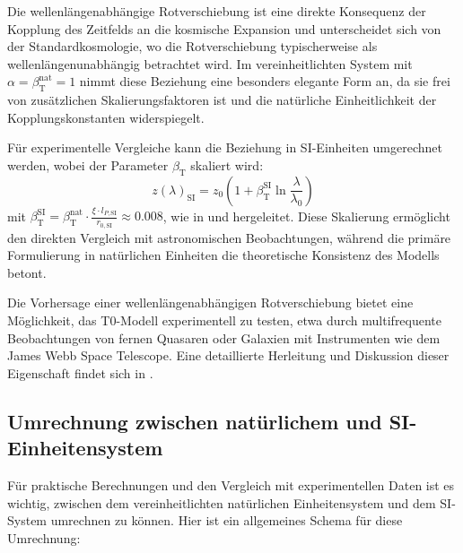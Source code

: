\documentclass[12pt,a4paper]{article}
\newcommand{\betaT}{\beta_{\text{T}}}
\begin{document}
	Die wellenlängenabhängige Rotverschiebung ist eine direkte Konsequenz der Kopplung des Zeitfelds an die kosmische Expansion und unterscheidet sich von der Standardkosmologie, wo die Rotverschiebung typischerweise als wellenlängenunabhängig betrachtet wird. Im vereinheitlichten System mit \(\alpha = \betaT^{\text{nat}} = 1\) nimmt diese Beziehung eine besonders elegante Form an, da sie frei von zusätzlichen Skalierungsfaktoren ist und die natürliche Einheitlichkeit der Kopplungskonstanten widerspiegelt.
	
	Für experimentelle Vergleiche kann die Beziehung in SI-Einheiten umgerechnet werden, wobei der Parameter \(\betaT\) skaliert wird:
	\begin{equation}
		z(\lambda)_{\text{SI}} = z_0 \left(1 + \betaT^{\text{SI}} \ln \frac{\lambda}{\lambda_0}\right)
	\end{equation}
	mit \(\betaT^{\text{SI}} = \betaT^{\text{nat}} \cdot \frac{\xi \cdot l_{P,\text{SI}}}{r_{0,\text{SI}}} \approx 0.008\), wie in \cite{pascher_emergente_gravitation_2025} und \cite{pascher_params_2025} hergeleitet. Diese Skalierung ermöglicht den direkten Vergleich mit astronomischen Beobachtungen, während die primäre Formulierung in natürlichen Einheiten die theoretische Konsistenz des Modells betont.
	
	Die Vorhersage einer wellenlängenabhängigen Rotverschiebung bietet eine Möglichkeit, das T0-Modell experimentell zu testen, etwa durch multifrequente Beobachtungen von fernen Quasaren oder Galaxien mit Instrumenten wie dem James Webb Space Telescope. Eine detaillierte Herleitung und Diskussion dieser Eigenschaft findet sich in \cite{pascher_emergente_gravitation_2025}.
	
	\subsection{Umrechnung zwischen natürlichem und SI-Einheitensystem}
	
	Für praktische Berechnungen und den Vergleich mit experimentellen Daten ist es wichtig, zwischen dem vereinheitlichten natürlichen Einheitensystem und dem SI-System umrechnen zu können. Hier ist ein allgemeines Schema für diese Umrechnung:
	
\end{document}

